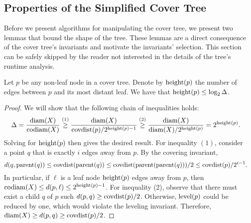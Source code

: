 \documentclass[../main.tex]{subfiles}
\newcommand{\dist}[2]{\distf({#1},{#2})}
\newcommand{\distf}{d}
\newcommand{\diam}[1]{\textnormal{diam}({#1})}
\newcommand{\codiam}[1]{\textnormal{codiam}({#1})}
\newcommand{\aspect}[1]{\Delta}
\newcommand{\mkfunction}[1]{\ifmmode{\text{{#1}}}}
\newcommand{\level}[1]      {\mkfunction{level}({#1})}
\newcommand{\parent}[1]     {\mkfunction{parent}({#1})}
\newcommand{\covdist}[1]    {\mkfunction{covdist}({#1})}
\newcommand{\maxdist}[1]    {\mkfunction{maxdist}({#1})}
\newcommand{\height}[1]     {\mkfunction{height}({#1})}
\begin{document}

\subsection{Properties of the Simplified Cover Tree}

Before we present algorithms for manipulating the cover tree, 
we present two lemmas that bound the shape of the tree.
These lemmas are a direct consequence of the cover tree's invariants and motivate the invariants' selection.
This section can be safely skipped by the reader not interested in the details of the tree's runtime analysis.


%


\begin{lemma}
    \label{lemma:height}
    Let $p$ be any non-leaf node in a cover tree.
    Denote by $\height{p}$ the number of edges between $p$ and its most distant leaf.
    We have that $\height{p} \le \log_2\aspect{X}$.
\end{lemma}

\begin{proof}
    We will show that the following chain of inequalities holds:
    \begin{equation}
        \aspect{X} 
        = \frac{\diam{X}}{\codiam{X}} 
        \overset{(1)}\ge \frac{\diam{X}}{\covdist{p}/2^{\height p-1}} 
        \overset{(2)}\ge \frac{\diam{X}}{\diam{X}/2^{\height p}} 
        = 2^{\height p}
        .
    \end{equation}
    Solving for $\height p$ then gives the desired result.
    For inequality $(1)$, consider a point $q$ that is exactly $i$ edges away from $p$.
    By the covering invariant, 
    \begin{equation}
        \dist{q}{\parent{q}} 
        \le 
        \covdist{\parent{q}}
        \le 
        \covdist{\parent{\parent{q}}}/2
        \le
        \covdist{p}/2^{i-1}
        .
    \end{equation}
    In particular, if $\ell$ is a leaf node $\height p$ edges away from $p$,
    then $\codiam{X}\le\dist{p}{\ell}\le2^{\height p-1}$.
    For inequality (2), observe that there must exist a child $q$ of $p$ such $\dist{p}{q} \ge \covdist{p}/2$.
    Otherwise, $\level p$ could be reduced by one, which would violate the leveling invariant.
    Therefore, $\diam{X} \ge \dist{p}{q} \ge \covdist{p}/2$.
\end{proof}
\end{document}
